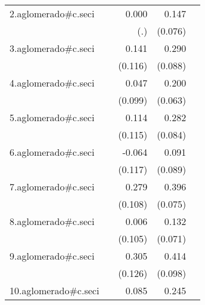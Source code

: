 {\begin{longtable}{l*{4}{D{.}{.}{-1}}}
\addlinespace
2.aglomerado#c.seci&                     &       0.000         &       0.147         &                     \\
            &                     &         (.)         &     (0.076)         &                     \\
\addlinespace
3.aglomerado#c.seci&                     &       0.141         &       0.290\sym{**} &                     \\
            &                     &     (0.116)         &     (0.088)         &                     \\
\addlinespace
4.aglomerado#c.seci&                     &       0.047         &       0.200\sym{**} &                     \\
            &                     &     (0.099)         &     (0.063)         &                     \\
\addlinespace
5.aglomerado#c.seci&                     &       0.114         &       0.282\sym{***}&                     \\
            &                     &     (0.115)         &     (0.084)         &                     \\
\addlinespace
6.aglomerado#c.seci&                     &      -0.064         &       0.091         &                     \\
            &                     &     (0.117)         &     (0.089)         &                     \\
\addlinespace
7.aglomerado#c.seci&                     &       0.279\sym{**} &       0.396\sym{***}&                     \\
            &                     &     (0.108)         &     (0.075)         &                     \\
\addlinespace
8.aglomerado#c.seci&                     &       0.006         &       0.132         &                     \\
            &                     &     (0.105)         &     (0.071)         &                     \\
\addlinespace
9.aglomerado#c.seci&                     &       0.305\sym{*}  &       0.414\sym{***}&                     \\
            &                     &     (0.126)         &     (0.098)         &                     \\
\addlinespace
10.aglomerado#c.seci&                     &       0.085         &       0.245\sym{***}&                     \\

\end{longtable}}
